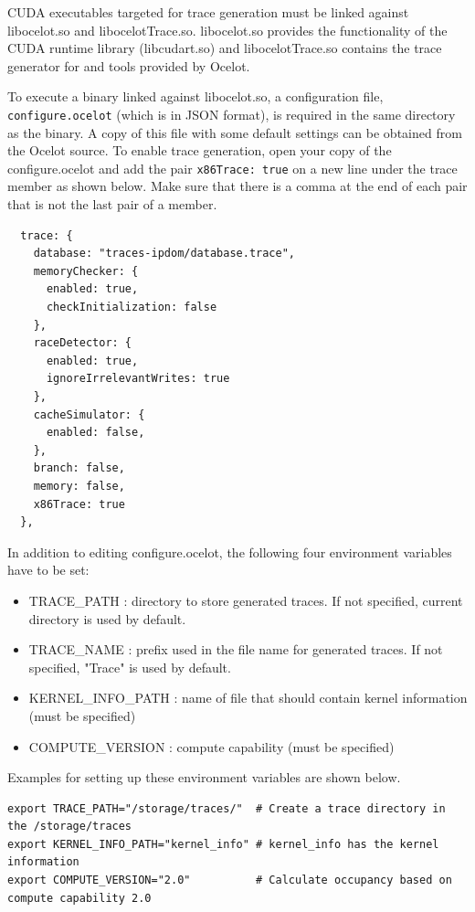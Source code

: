 CUDA executables targeted for trace generation must be linked against
libocelot.so and libocelotTrace.so. libocelot.so provides the functionality of
the CUDA runtime library (libcudart.so) and libocelotTrace.so contains the
trace generator for \SIM and tools provided by Ocelot.

To execute a binary linked against libocelot.so, a configuration file,
   \Verb+configure.ocelot+ (which is in JSON format), is required in the same
   directory as the binary. A copy of this file with some default settings can
   be obtained from the Ocelot source. To enable trace generation, open your
   copy of the configure.ocelot and add the pair \Verb+x86Trace: true+ on a new
   line under the trace member as shown below.  Make sure that there is a comma
   at the end of each pair that is not the last pair of a member.

\begin{Verbatim}
  trace: {
    database: "traces-ipdom/database.trace",
    memoryChecker: {
      enabled: true,
      checkInitialization: false
    },
    raceDetector: {
      enabled: true,
      ignoreIrrelevantWrites: true
    },
    cacheSimulator: {
      enabled: false,
    },
    branch: false,
    memory: false,
    x86Trace: true
  },
\end{Verbatim}

In addition to editing configure.ocelot, the following four environment
variables have to be set:

\begin{itemize}\itemsep2pt
\item TRACE\_PATH : directory to store generated traces. If not specified, current directory is used by default.
\item TRACE\_NAME : prefix used in the file name for generated traces. If not specified, "Trace" is used by default.
\item KERNEL\_INFO\_PATH : name of file that should contain kernel information (must be specified)
\item COMPUTE\_VERSION : compute capability (must be specified)
\end{itemize}


Examples for setting up these environment variables are shown below.

\begin{Verbatim}
export TRACE_PATH="/storage/traces/"  # Create a trace directory in the /storage/traces
export KERNEL_INFO_PATH="kernel_info" # kernel_info has the kernel information
export COMPUTE_VERSION="2.0"          # Calculate occupancy based on compute capability 2.0
\end{Verbatim}

